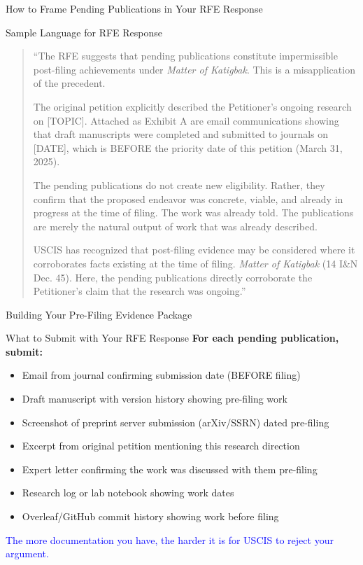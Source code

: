 \documentclass[11pt]{beamer}
\begin{document}
	\begin{frame}{How to Frame Pending Publications in Your RFE Response}
		\scriptsize
		\begin{block}{Sample Language for RFE Response}
			\begin{quote}
				``The RFE suggests that pending publications constitute impermissible post-filing achievements under \textit{Matter of Katigbak}. This is a misapplication of the precedent.
				
				The original petition explicitly described the Petitioner's ongoing research on [TOPIC]. Attached as Exhibit A are email communications showing that draft manuscripts were completed and submitted to journals on [DATE], which is BEFORE the priority date of this petition (March 31, 2025).
				
				The pending publications do not create new eligibility. Rather, they confirm that the proposed endeavor was concrete, viable, and already in progress at the time of filing. The work was already told. The publications are merely the natural output of work that was already described.
				
				USCIS has recognized that post-filing evidence may be considered where it corroborates facts existing at the time of filing. \textit{Matter of Katigbak} (14 I\&N Dec. 45). Here, the pending publications directly corroborate the Petitioner's claim that the research was ongoing.''
			\end{quote}
		\end{block}
	\end{frame}
	
	\begin{frame}{Building Your Pre-Filing Evidence Package}
		\scriptsize
		\begin{block}{What to Submit with Your RFE Response}
			\textbf{For each pending publication, submit:}
			\begin{itemize}
				\item [$\square$] Email from journal confirming submission date (BEFORE filing)
				\item [$\square$] Draft manuscript with version history showing pre-filing work
				\item [$\square$] Screenshot of preprint server submission (arXiv/SSRN) dated pre-filing
				\item [$\square$] Excerpt from original petition mentioning this research direction
				\item [$\square$] Expert letter confirming the work was discussed with them pre-filing
				\item [$\square$] Research log or lab notebook showing work dates
				\item [$\square$] Overleaf/GitHub commit history showing work before filing
			\end{itemize}
			\textcolor{blue}{The more documentation you have, the harder it is for USCIS to reject your argument.}
		\end{block}
	\end{frame}
	
\end{document}
